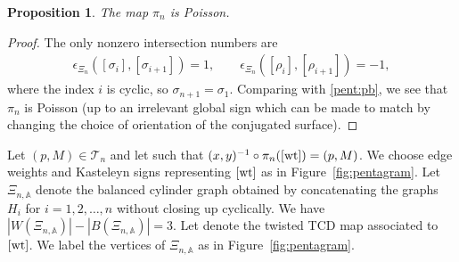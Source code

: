 \documentclass[pdftex]{sigma}
\numberwithin{equation}{section}
\newtheorem{Proposition}[Theorem]{Proposition}
 { \theoremstyle{definition}
\newtheorem{Definition}[Theorem]{Definition}
\newtheorem{Note}[Theorem]{Note}
\newtheorem{Example}[Theorem]{Example}
\newtheorem{Remark}[Theorem]{Remark} }
\newcommand{\CP}{{\mathbb C\mathrm P}}
\newcommand{\A}{{\mathbb A}}
\newcommand{\ra}{\rightarrow}
\newcommand{\wt}{{\rm wt}}
\begin{document}

	\begin{Proposition}
		The map $\pi_n$ is Poisson.
	\end{Proposition}
	\begin{proof}
		The only nonzero intersection numbers are
		\begin{align*}
			\epsilon_{\Xi_n}([\sigma_i],[\sigma_{i + 1}])= 1, \qquad \epsilon_{\Xi_n}([\rho_i],[\rho_{i + 1}])= -1,
		\end{align*}
		where the index $i$ is cyclic, so $\sigma_{n+1}=\sigma_1$.
		Comparing with \eqref{pent:pb}, we see that $\pi_n$ is Poisson (up to an irrelevant global sign which can be made to match by changing the choice of orientation of the conjugated surface).
	\end{proof}

	Let $(p,M) \in \mathcal T_n$ and let \smash{$[\wt] \in \mathcal X_{N(\Xi_n)}^\lambda$} such that $(x,y)^{-1} \circ \pi_n([\wt])=(p,M)$. We choose edge weights and Kasteleyn signs representing $[\wt]$ as in Figure~\ref{fig:pentagram}. Let $\Xi_{n,\A}$ denote the balanced cylinder graph obtained by concatenating the graphs $H_i$ for $i=1,2,\dots,n$ without closing up cyclically.	We have $|W(\Xi_{n,\A})|-|B(\Xi_{n,\A})|=3$. Let \smash{$P\colon W\big(\Xi_{n,\widehat \A}\big) \ra \CP^2$} denote the twisted TCD map associated to $[\wt]$. We label the vertices of $\Xi_{n,\A}$ as in Figure~\ref{fig:pentagram}.
	
\end{document}
